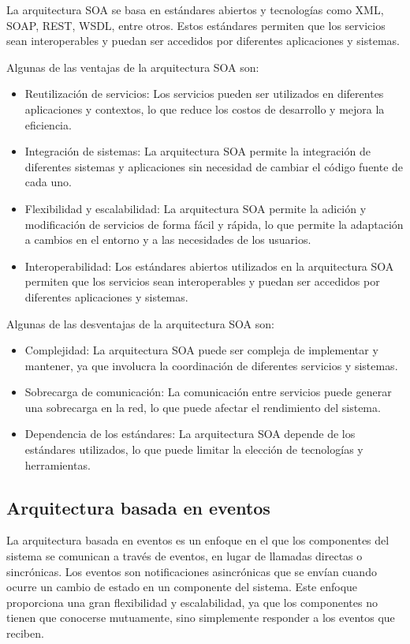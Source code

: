 \documentclass[executivepaper]{article}
\begin{document}
La arquitectura SOA se basa en estándares abiertos y tecnologías como XML, SOAP, REST, WSDL, entre otros. Estos estándares permiten que los servicios sean interoperables y puedan ser accedidos por diferentes aplicaciones y sistemas.

Algunas de las ventajas de la arquitectura SOA son:

\begin{itemize}
\item Reutilización de servicios: Los servicios pueden ser utilizados en diferentes aplicaciones y contextos, lo que reduce los costos de desarrollo y mejora la eficiencia.
\item Integración de sistemas: La arquitectura SOA permite la integración de diferentes sistemas y aplicaciones sin necesidad de cambiar el código fuente de cada uno.
\item Flexibilidad y escalabilidad: La arquitectura SOA permite la adición y modificación de servicios de forma fácil y rápida, lo que permite la adaptación a cambios en el entorno y a las necesidades de los usuarios.
\item Interoperabilidad: Los estándares abiertos utilizados en la arquitectura SOA permiten que los servicios sean interoperables y puedan ser accedidos por diferentes aplicaciones y sistemas.
\end{itemize}

Algunas de las desventajas de la arquitectura SOA son:

\begin{itemize}
\item Complejidad: La arquitectura SOA puede ser compleja de implementar y mantener, ya que involucra la coordinación de diferentes servicios y sistemas.
\item Sobrecarga de comunicación: La comunicación entre servicios puede generar una sobrecarga en la red, lo que puede afectar el rendimiento del sistema.
\item Dependencia de los estándares: La arquitectura SOA depende de los estándares utilizados, lo que puede limitar la elección de tecnologías y herramientas.
\end{itemize}

\subsection{Arquitectura basada en eventos}

La arquitectura basada en eventos es un enfoque en el que los componentes del sistema se comunican a través de eventos, en lugar de llamadas directas o sincrónicas. Los eventos son notificaciones asincrónicas que se envían cuando ocurre un cambio de estado en un componente del sistema. Este enfoque proporciona una gran flexibilidad y escalabilidad, ya que los componentes no tienen que conocerse mutuamente, sino simplemente responder a los eventos que reciben.
\end{document}
